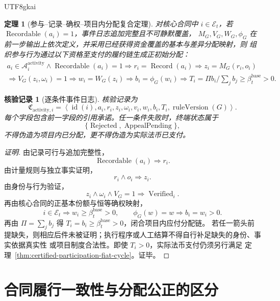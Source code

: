 \documentclass[12pt,a4paper,openany]{report}
\newtheorem{theorem}{定理}[chapter]
\newtheorem{Certificate}{核验记录}[chapter]
\newcommand{\Act}{\mathcal A}
\newcommand{\Tuple}[1]{\left\langle #1\right\rangle}
\DeclareMathOperator{\Verified}{Verified}
\begin{document}
\begin{CJK*}{UTF8}{gkai}
\begin{theorem}[参与--记录--确权--项目内分配复合定理]
\label{thm:activity-participation-composition}
对核心合同中 \(i\in\mathcal E_t\)，若 \(\operatorname{Recordable}(a_i)=1\)，事件日志追加完整且不可静默覆盖，
\(M_G,V_G,W_G,\phi_G\) 在前一步输出上依次定义，并采用已经获得资金覆盖的基本与差异分配映射，则
组织参与行为通过以下资格至支付的履约链生成正初始分配：
\[
\begin{gathered}
  a_i\in\Act_i^{\mathrm{activity}}
  \wedge\operatorname{Recordable}(a_i)=1
  \Longrightarrow
  r_i=\operatorname{Record}(a_i)
  \Longrightarrow
  z_i=M_G(r_i,o_i)\\
  \Longrightarrow
  V_G(z_i,\omega_i)=1
  \Longrightarrow
  w_i=W_G(z_i)
  \Longrightarrow
  b_i=\phi_G(w_i)
  \Longrightarrow
  T_i=\Pi b_i/\sum_jb_j\ge\beta_t^{\mathrm{base}}>0.
\end{gathered}
\]
\end{theorem}

\begin{Certificate}[逐条件事件日志]
核验记录为
\[
  \mathfrak C_{\mathrm{activity},i}
  =
  \Tuple{
  \operatorname{id}(i),a_i,r_i,z_i,
  \omega_i,v_i,w_i,b_i,T_i,
  \operatorname{ruleVersion}(G)}.
\]
每个字段包含前一字段的引用承诺。任一条件失败时，终端状态属于
\[
  \{\operatorname{Rejected},\operatorname{AppealPending}\},
\]
不得伪造为项目内已分配，更不得伪造为实际法币已支付。
\end{Certificate}

\begin{proof}[证明]
由记录可行与追加完整性，
\[
  \operatorname{Recordable}(a_i)
  \Longrightarrow r_i.
\]
由计量规则与独立事实证明，
\[
  r_i\wedge o_i\Longrightarrow z_i.
\]
由身份与行为验证，
\[
  z_i\wedge\omega_i\wedge V_G=1
  \Longrightarrow \Verified_i.
\]
再由核心合同的正基本份额与恒等确权映射，
\[
  i\in\mathcal E_t
  \Longrightarrow w_i\ge\beta_t^{\mathrm{base}}>0,
  \qquad
  \phi_G(w)=w
  \Longrightarrow b_i=w_i>0.
\]
再由 \(\Pi=\sum_jb_j\) 得 \(T_i=b_i\ge\beta_t^{\mathrm{base}}>0\)，闭合项目内应付分配链。
若任一箭头前提缺失，则相应后件未被证明；执行程序或人工结算不得自行补足缺失的身份、事实依据真实性
或项目制度合法性。即使 \(T_i>0\)，实际法币支付仍须另行满足
定理~\ref{thm:certified-participation-fiat-cycle}。证毕。
\end{proof}

\section{合同履行一致性与分配公正的区分}


\end{CJK*}
\end{document}
